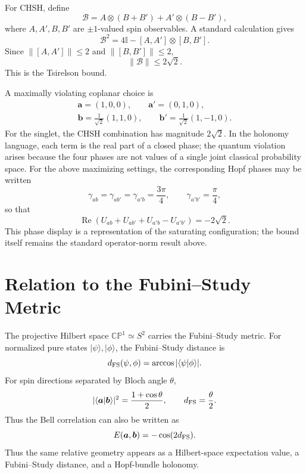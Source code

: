 \documentclass[
  aps,
  pra,
  reprint,
  superscriptaddress,
  nofootinbib,
  longbibliography,
  floatfix,
  amsmath,
  amssymb
]{revtex4-2}
\theoremstyle{plain}
\theoremstyle{definition}
\theoremstyle{remark}
\newcommand{\ket}[1]{\lvert #1\rangle}
\newcommand{\braket}[2]{\langle #1\vert #2\rangle}
\newcommand{\CP}{\mathbb{CP}}
\newcommand{\Id}{\mathbb{I}}
\begin{document}
For CHSH, define
\begin{equation}
\mathcal B=A\otimes(B+B')+A'\otimes(B-B'),
\end{equation}
where \(A,A',B,B'\) are \(\pm1\)-valued spin observables.  A standard calculation gives
\begin{equation}
\mathcal B^2=4\Id-[A,A']\otimes[B,B'].
\end{equation}
Since \(\lVert[A,A']\rVert\le 2\) and \(\lVert[B,B']\rVert\le 2\),
\begin{equation}
\lVert\mathcal B\rVert\le 2\sqrt2.
\end{equation}
This is the Tsirelson bound.

A maximally violating coplanar choice is
\begin{equation}
\begin{gathered}
\bm a=(1,0,0),\qquad \bm a'=(0,1,0),\\
\bm b=\frac{1}{\sqrt2}(1,1,0),\qquad
\bm b'=\frac{1}{\sqrt2}(1,-1,0).
\end{gathered}
\end{equation}
For the singlet, the CHSH combination has magnitude \(2\sqrt2\).  In the holonomy language, each term is the real part of a closed phase; the quantum violation arises because the four phases are not values of a single joint classical probability space.  For the above maximizing settings, the corresponding Hopf phases may be written
\begin{equation}
\gamma_{ab}=\gamma_{ab'}=\gamma_{a'b}=\frac{3\pi}{4},
\qquad
\gamma_{a'b'}=\frac{\pi}{4},
\end{equation}
so that
\begin{equation}
\operatorname{Re}(U_{ab}+U_{ab'}+U_{a'b}-U_{a'b'})=-2\sqrt2.
\end{equation}
This phase display is a representation of the saturating configuration; the bound itself remains the standard operator-norm result above.

\section{Relation to the Fubini--Study Metric}
\label{sec:fs}

The projective Hilbert space \(\CP^1\simeq S^2\) carries the Fubini--Study metric.  For normalized pure states \(\ket{\psi},\ket{\phi}\), the Fubini--Study distance is
\begin{equation}
d_{\rm FS}(\psi,\phi)=\arccos |\braket{\psi}{\phi}|.
\end{equation}
For spin directions separated by Bloch angle \(\theta\),
\begin{equation}
|\braket{\bm a}{\bm b}|^2=\frac{1+\cos\theta}{2},
\qquad
 d_{\rm FS}=\frac{\theta}{2}.
\end{equation}
Thus the Bell correlation can also be written as
\begin{equation}
E(\bm a,\bm b)=-\cos(2d_{\rm FS}).
\end{equation}
Thus the same relative geometry appears as a Hilbert-space expectation value, a Fubini--Study distance, and a Hopf-bundle holonomy.
\end{document}

